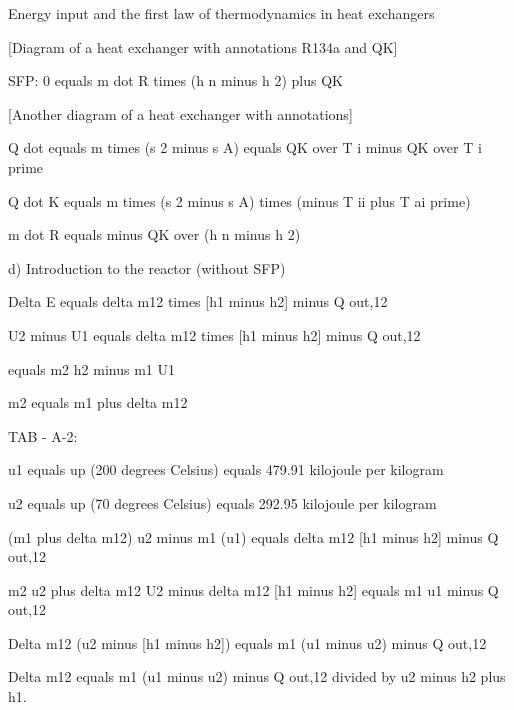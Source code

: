 Energy input and the first law of thermodynamics in heat exchangers

[Diagram of a heat exchanger with annotations R134a and QK]

SFP: 0 equals m dot R times (h n minus h 2) plus QK

[Another diagram of a heat exchanger with annotations]

Q dot equals m times (s 2 minus s A) equals QK over T i minus QK over T i prime

Q dot K equals m times (s 2 minus s A) times (minus T ii plus T ai prime)

m dot R equals minus QK over (h n minus h 2)

d) Introduction to the reactor (without SFP)

Delta E equals delta m12 times [h1 minus h2] minus Q out,12

U2 minus U1 equals delta m12 times [h1 minus h2] minus Q out,12

equals m2 h2 minus m1 U1

m2 equals m1 plus delta m12

TAB - A-2:

u1 equals up (200 degrees Celsius) equals 479.91 kilojoule per kilogram

u2 equals up (70 degrees Celsius) equals 292.95 kilojoule per kilogram

(m1 plus delta m12) u2 minus m1 (u1) equals delta m12 [h1 minus h2] minus Q out,12

m2 u2 plus delta m12 U2 minus delta m12 [h1 minus h2] equals m1 u1 minus Q out,12

Delta m12 (u2 minus [h1 minus h2]) equals m1 (u1 minus u2) minus Q out,12

Delta m12 equals m1 (u1 minus u2) minus Q out,12 divided by u2 minus h2 plus h1.